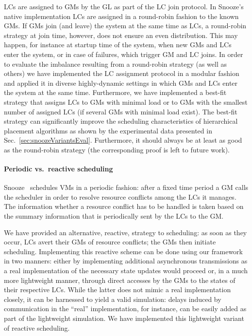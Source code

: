 LCs are assigned to GMs by the GL as part of the LC join protocol. In
Snooze's native implementation LCs are assigned in a round-robin
fashion to the known GMs. If GMs join (and leave) the system at the
same time as LCs, a round-robin strategy at join time, however, does
not ensure an even distribution. This may happen, for instance at
startup time of the system, when new GMs and LCs enter the system, or
in case of failures, which trigger GM and LC joins. In order to
evaluate the imbalance resulting from a round-robin strategy (as well
as others) we have implemented the LC assignment protocol in a modular
fashion and applied it in diverse highly-dynamic settings in which GMs
and LCs enter the system at the same time. Furthermore, we have
implemented a best-fit strategy that assigns LCs to GMs with minimal
load or to GMs with the smallest number of assigned LCs (if several
GMs with minimal load exist). The best-fit strategy can significantly
improve the scheduling characteristics of hierarchical placement
algorithms as shown by the experimental data presented in
Sec.~\ref{sec:snoozeVariantsEval}. Furthermore, it should always be
at least as good as the round-robin strategy (the corresponding proof
is left to future work).


\paragraph{Periodic vs.\ reactive scheduling}

Snooze~\cite{feller:ccgrid12} schedules VMs in a periodic fashion:
after a fixed time period a GM calls the scheduler in order to resolve
resource conflicts among the LCs it manages. The information whether a
resource conflict has to be handled is taken based on the summary
information that is periodically sent by the LCs to the GM.

We have provided an alternative, reactive, strategy to scheduling: as
soon as they occur, LCs avert their GMs of resource conflicts; the GMs
then initiate scheduling. Implementing this reactive scheme can be
done using our framework in two manners: either by implementing
additional asynchronous transmissions as a real implementation of the
necessary state updates would proceed or, in a much more lightweight
manner, through direct accesses by the GMs to the states of their
respective LCs. While the latter does not mimic a real implementation
closely, it can be harnessed to yield a valid simulation: delays
induced by communication in the ``real'' implementation, for instance,
can be easily added as part of the lightweight simulation. We have
implemented this lightweight variant of reactive scheduling.


